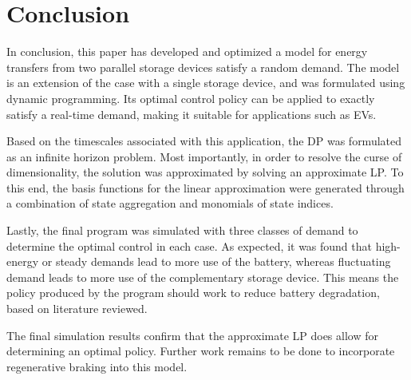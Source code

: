 \documentclass[conference]{IEEEtran}
\begin{document}

\section{Conclusion}
In conclusion, this paper has developed and optimized a model for energy transfers from two parallel storage devices satisfy a random demand. The model is an extension of the case with a single storage device, and was formulated using dynamic programming. Its optimal control policy can be applied to exactly satisfy a real-time demand, making it suitable for applications such as EVs.

Based on the timescales associated with this application, the DP was formulated as an infinite horizon problem. Most importantly, in order to resolve the curse of dimensionality, the solution was approximated by solving an approximate LP. To this end, the basis functions for the linear approximation were generated through a combination of state aggregation and monomials of state indices.

Lastly, the final program was simulated with three classes of demand to determine the optimal control in each case. As expected, it was found that high-energy or steady demands lead to more use of the battery, whereas fluctuating demand leads to more use of the complementary storage device. This means the policy produced by the program should work to reduce battery degradation, based on literature reviewed.

The final simulation results confirm that the approximate LP does allow for determining an optimal policy. Further work remains to be done to incorporate regenerative braking into this model.

\printbibliography
\end{document}
